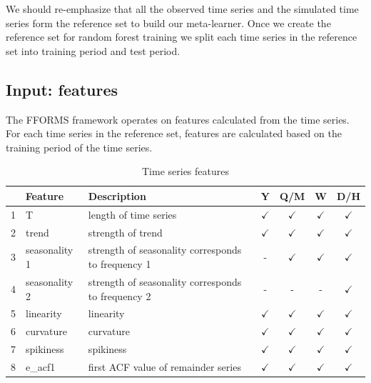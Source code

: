 \documentclass[11pt,a4paper,]{article}
\def\yes{$\checkmark$}
\begin{document}
We should re-emphasize that all the observed time series and the simulated time series form the reference set to build our meta-learner. Once we create the reference set for random forest training we split each time series in the reference set into training period and test period.

\hypertarget{input-features}{%
\subsection{Input: features}\label{input-features}}

The FFORMS framework operates on features calculated from the time series. For each time series in the reference set, features are calculated based on the training period of the time series.

\begin{table}[!htp]
\centering\footnotesize\tabcolsep=0.12cm
\caption{Time series features}
\label{feature}
\begin{tabular}{llp{}cccc}
\toprule
\multicolumn{2}{c}{Feature} & Description & Y & Q/M & W & D/H\\
\midrule
1  & T              & length of time series                                                                   & \yes  & \yes & \yes & \yes\\
2  & trend          & strength of trend                                                                       & \yes  & \yes & \yes & \yes\\
3  & seasonality 1    & strength of seasonality corresponds to frequency 1                                                              & -     & \yes & \yes & \yes\\
4  & seasonality 2    & strength of seasonality corresponds to frequency 2                                                              & -     & - & -& \yes\\
5  & linearity      & linearity                                                                               & \yes  & \yes & \yes & \yes\\
6  & curvature      & curvature                                                                               & \yes  & \yes & \yes & \yes\\
7  & spikiness      & spikiness                                                                               & \yes  & \yes & \yes & \yes\\
8  & e\_acf1        & first ACF value of remainder series                                                     & \yes  & \yes & \yes & \yes\\

\end{tabular}
\end{table}
\end{document}
